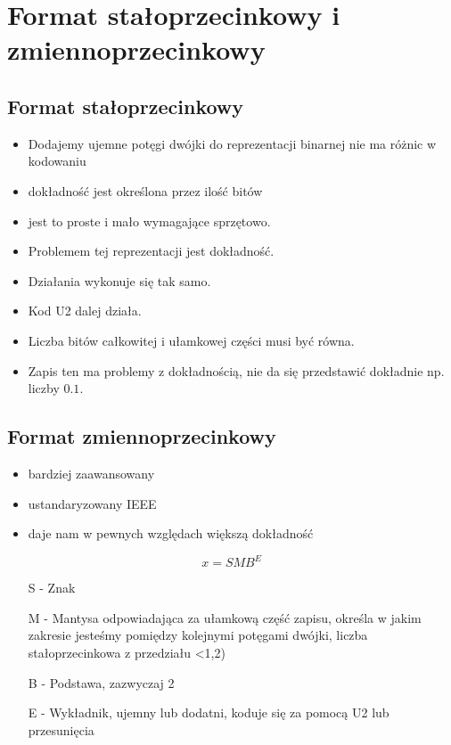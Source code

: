 \documentclass[a4paper]{article}
\begin{document}
\section{Format stałoprzecinkowy i zmiennoprzecinkowy}

\subsection{Format stałoprzecinkowy}
\begin{itemize}
    \item Dodajemy ujemne potęgi dwójki do reprezentacji binarnej nie ma różnic w kodowaniu
    \item dokładność jest określona przez ilość bitów
    \item jest to proste i mało wymagające sprzętowo.
    \item Problemem tej reprezentacji jest dokładność.
    \item Działania wykonuje się tak samo.
    \item Kod U2 dalej działa.
    \item Liczba bitów całkowitej i ułamkowej części musi być równa.
    \item Zapis ten ma problemy z dokładnością, nie da się przedstawić dokładnie np. liczby $0.1$.
\end{itemize}

\subsection{Format zmiennoprzecinkowy}
\begin{itemize}
    \item bardziej zaawansowany
    \item ustandaryzowany IEEE
    \item daje nam w pewnych względach większą dokładność
\end{itemize}

\begin{equation*}
    x = SMB^E
\end{equation*}

\begin{itemize}
    \item[S] - Znak
    \item[M] - Mantysa odpowiadająca za ułamkową część zapisu, określa w jakim zakresie jesteśmy pomiędzy kolejnymi potęgami dwójki, liczba stałoprzecinkowa z przedziału <1,2)
    \item[B] - Podstawa, zazwyczaj 2
    \item[E] - Wykładnik, ujemny lub dodatni, koduje się za pomocą U2 lub przesunięcia
\end{itemize}
\end{document}
